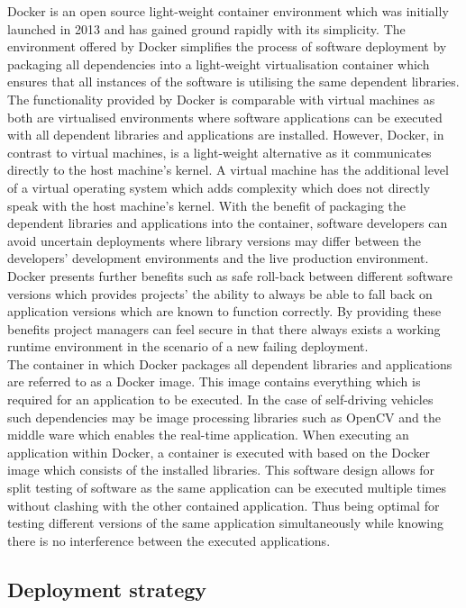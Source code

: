 Docker is an open source light-weight container environment which was initially launched in 2013 and has gained ground rapidly with its simplicity. The environment offered by Docker simplifies the process of software deployment by packaging all dependencies into a light-weight virtualisation container which ensures that all instances of the software is utilising the same dependent libraries. The functionality provided by Docker is comparable with virtual machines as both are virtualised environments where software applications can be executed with all dependent libraries and applications are installed. However, Docker, in contrast to virtual machines, is a light-weight alternative as it communicates directly to the host machine's kernel. A virtual machine has the additional level of a virtual operating system which adds complexity which does not directly speak with the host machine's kernel. With the benefit of packaging the dependent libraries and applications into the container, software developers can avoid uncertain deployments where library versions may differ between the developers' development environments and the live production environment. Docker presents further benefits such as safe roll-back between different software versions which provides projects' the ability to always be able to fall back on application versions which are known to function correctly. By providing these benefits project managers can feel secure in that there always exists a working runtime environment in the scenario of a new failing deployment.\\

The container in which Docker packages all dependent libraries and applications are referred to as a Docker image. This image contains everything which is required for an application to be executed. In the case of self-driving vehicles such dependencies may be image processing libraries such as OpenCV and the middle ware which enables the real-time application. When executing an application within Docker, a container is executed with based on the Docker image which consists of the installed libraries. This software design allows for split testing of software as the same application can be executed multiple times without clashing with the other contained application. Thus being optimal for testing different versions of the same application simultaneously while knowing there is no interference between the executed applications.

\subsection{Deployment strategy}

